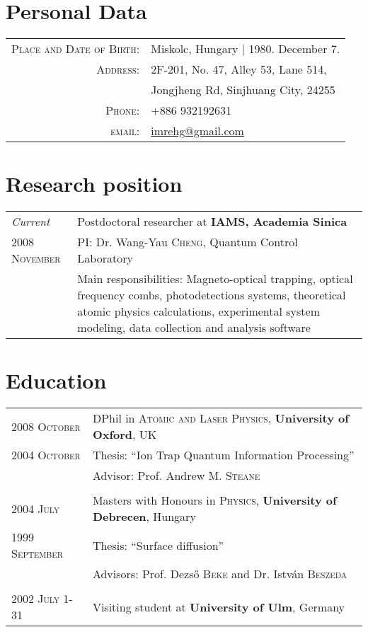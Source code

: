 \documentclass[10pt]{article}
\begin{document}
\thispagestyle{empty}
\par{}

\section{Personal Data}

\begin{tabular}{rl}
    \textsc{Place and Date of Birth:} & Miskolc, Hungary | 1980. December 7. \\
    \textsc{Address:}   & 2F-201, No. 47, Alley 53, Lane 514, \\
                        & Jongjheng Rd, Sinjhuang City, 24255 \\
    \textsc{Phone:}     & +886 932192631 \\
    \textsc{email:}     & \href{mailto:imrehg@gmail.com}{imrehg@gmail.com}
\end{tabular}

\section{Research position}
\begin{tabular}{p{3cm}|p{11cm}}
 \emph{Current} & Postdoctoral researcher at \textbf{IAMS, Academia Sinica}\\
\textsc{2008 November}& \small{PI: Dr. Wang-Yau \textsc{Cheng}, Quantum Control Laboratory}\\
&\footnotesize{Main responsibilities: Magneto-optical trapping, optical frequency combs, photodetections systems, theoretical atomic physics calculations, experimental system modeling, data collection and analysis software}
\end{tabular}

\section{Education}
\begin{tabular}{p{3cm}|p{11cm}}	
 \textsc{2008 October}& DPhil in \textsc{Atomic and Laser Physics}, \textbf{University of Oxford}, UK\\
 \textsc{2004 October} & Thesis: ``Ion Trap Quantum Information Processing'' \\ & \small Advisor: Prof. Andrew M. \textsc{Steane}\\\multicolumn{2}{c}{} \\

\textsc{2004 July} & Masters with Honours in \textsc{Physics}, \textbf{University of Debrecen}, Hungary\\
\textsc{1999 September} & Thesis: ``Surface diffusion'' \\ & \small Advisors: Prof. Dezs\H{o} \textsc{Beke} and Dr. Istv\'an \textsc{Beszeda}\\\multicolumn{2}{c}{} \\

\textsc{2002 July 1-31}& Visiting student at \textbf{University of Ulm}, Germany
\end{tabular}
\end{document}
